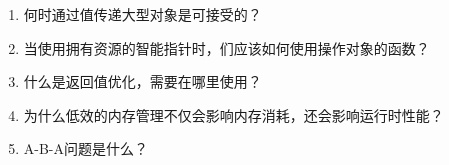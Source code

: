 \begin{enumerate}
\item 
何时通过值传递大型对象是可接受的？

\item 
当使用拥有资源的智能指针时，们应该如何使用操作对象的函数？

\item 
什么是返回值优化，需要在哪里使用？

\item
为什么低效的内存管理不仅会影响内存消耗，还会影响运行时性能？

\item 
A-B-A问题是什么？

\end{enumerate}